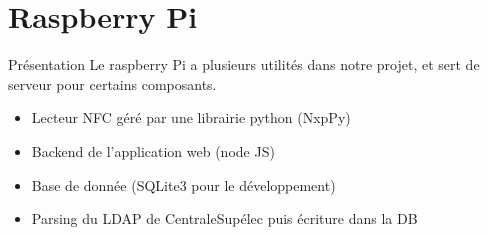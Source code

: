 \documentclass[aspectratio=169]{beamer}
\begin{document}
\section{Raspberry Pi}

\begin{frame}{Présentation}
  Le raspberry Pi a plusieurs utilités dans notre projet, et sert de serveur pour certains composants.
  \begin{itemize}
    \item Lecteur NFC géré par une librairie python (NxpPy)
    \item Backend de l'application web (node JS)
    \item Base de donnée (SQLite3 pour le développement)
    \item Parsing du LDAP de CentraleSupélec puis écriture dans la DB
  \end{itemize}


\end{frame}
\end{document}
